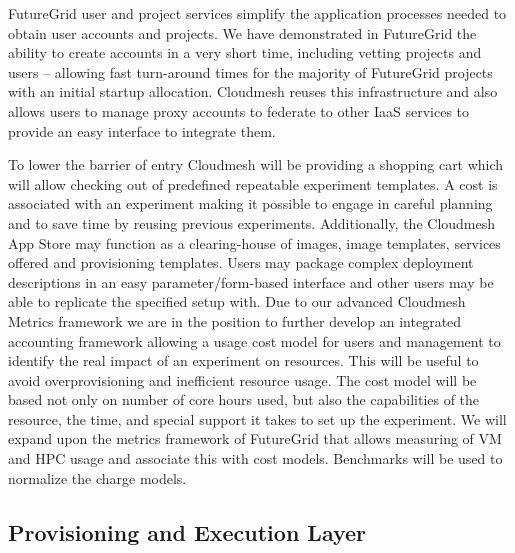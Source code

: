 \documentclass{tex/sig-alternate-2013}
\begin{document}
\begin{description}[leftmargin=0pt,itemsep=0pt,topsep=0pt]

\item[User and Project Services.] FutureGrid user and project services simplify the application processes needed to obtain user accounts and projects. We have demonstrated in FutureGrid the ability to create accounts in a very short time, including vetting projects and users -- allowing fast turn-around times for the majority of FutureGrid projects with an initial startup allocation. Cloudmesh reuses this infrastructure and also allows users to manage proxy accounts to federate to other IaaS services to provide an easy interface to integrate them.

\item[Accounting and App Store.] To lower the barrier of entry Cloudmesh will be providing a shopping cart which will allow checking out of predefined repeatable experiment templates. A cost is associated with an experiment making it possible to engage in careful planning and to save time by reusing previous experiments. Additionally, the Cloudmesh App Store may function as a clearing-house of images, image templates, services offered and provisioning templates. Users may package complex deployment descriptions in an easy parameter/form-based interface and other users may be able to replicate the specified setup with.
Due to our advanced Cloudmesh Metrics framework we are in the position to further develop an integrated accounting framework allowing a usage cost model for users and management to identify the real impact of an experiment on resources. This will be useful to avoid overprovisioning and inefficient resource usage. The cost model will be based not only on number of core hours used, but also the capabilities of the resource, the time, and special support it takes to set up the experiment. We will expand upon the metrics framework of FutureGrid that allows measuring of VM and HPC usage and associate this with cost models. Benchmarks will be used to normalize the charge models.

\end{description}

\subsection{Provisioning and Execution Layer}
\end{document}
